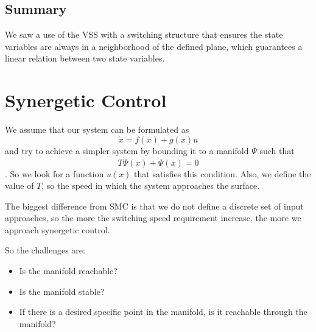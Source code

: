 \subsection*{Summary}

We saw a use of the VSS with a switching structure that ensures the state variables are always in a neighborhood of the defined plane, which guarantees a linear relation between two state variables.

\section*{Synergetic Control}

We assume that our system can be formulated as \[
    \dot{x} = f(x) + g(x)u
\] and try to achieve a simpler system by bounding it to a manifold $\Psi$ such that \[
T \dot{\Psi}(x) + \Psi(x) = 0
\]. So we look for a function $u(x)$ that satisfies this condition. Also, we define the value of $T$, so the speed in which the system approaches the surface.

The biggest difference from SMC is that we do not define a discrete set of input approaches, so the more the switching speed requirement increase, the more we approach synergetic control.

So the challenges are:
\begin{itemize}
    \item Is the manifold reachable?
    \item Is the manifold stable?
    \item If there is a desired specific point in the manifold, is it reachable through the manifold?
\end{itemize}

